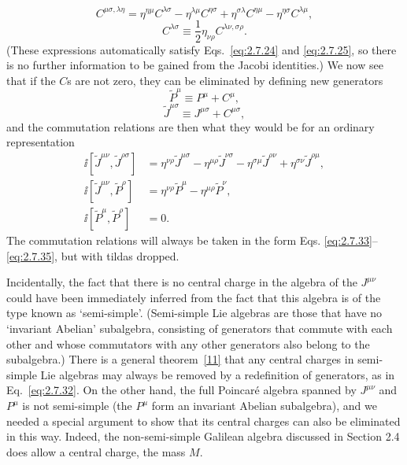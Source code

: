 \begin{equation}
  C^{\mu\sigma,\lambda\eta}
    =\eta^{\eta\mu}C^{\lambda\sigma}
      -\eta^{\lambda\mu}C^{\eta\sigma}
      +\eta^{\sigma\lambda}C^{\eta\mu}
      -\eta^{\eta\sigma}C^{\lambda\mu},
  \tag{2.7.29}\label{eq:2.7.29}
\end{equation}
\begin{equation}
  C^{\lambda\sigma}\equiv
    \frac{1}{2}\eta_{\nu\rho}C^{\lambda\nu,\sigma\rho}.
  \tag{2.7.30}\label{eq:2.7.30}
\end{equation}
(These expressions automatically satisfy Eqs.~\eqref{eq:2.7.24} and \eqref{eq:2.7.25}, so there
is no further information to be gained from the Jacobi identities.) We now see
that if the $C$s are not zero, they can be eliminated by defining new
generators
\begin{equation}
  \widetilde P^\mu\equiv P^\mu+C^\mu,
  \tag{2.7.31}\label{eq:2.7.31}
\end{equation}
\begin{equation}
  \widetilde J^{\mu\sigma}\equiv J^{\mu\sigma}+C^{\mu\sigma},
  \tag{2.7.32}\label{eq:2.7.32}
\end{equation}
and the commutation relations are then what they would be for an ordinary
representation
\begin{align}
  \ii[\widetilde J^{\mu\nu},\widetilde J^{\rho\sigma}]
  &={}
    \eta^{\nu\rho}\widetilde J^{\mu\sigma}
    -\eta^{\mu\rho}\widetilde J^{\nu\sigma}
    -\eta^{\sigma\mu}\widetilde J^{\rho\nu}
    +\eta^{\sigma\nu}\widetilde J^{\rho\mu},
  \tag{2.7.33}\label{eq:2.7.33}\\
  \ii[\widetilde J^{\mu\nu},\widetilde P^\rho]
  &={}
    \eta^{\nu\rho}\widetilde P^\mu
    -\eta^{\mu\rho}\widetilde P^\nu,
  \tag{2.7.34}\label{eq:2.7.34}\\
  \ii[\widetilde P^\mu,\widetilde P^\rho]&=0.
  \tag{2.7.35}\label{eq:2.7.35}
\end{align}
The commutation relations will always be taken in the form Eqs.
\eqref{eq:2.7.33}--\eqref{eq:2.7.35}, but with tildas dropped.

Incidentally, the fact that there is no central charge in the algebra of the
$J^{\mu\nu}$ could have been immediately inferred from the fact that this
algebra is of the type known as `semi-simple'. (Semi-simple Lie algebras are
those that have no `invariant Abelian' subalgebra, consisting of generators that
commute with each other and whose commutators with any other generators also
belong to the subalgebra.) There is a general theorem~\hyperref[ref:2.11]{[11]} that
any central charges in semi-simple Lie algebras may always be removed by a
redefinition of generators, as in Eq.~\eqref{eq:2.7.32}. On the other hand, the full
Poincar\'e algebra spanned by $J^{\mu\nu}$ and $P^\mu$ is not semi-simple (the
$P^\mu$ form an invariant Abelian subalgebra), and we needed a special argument
to show that its central charges can also be eliminated in this way. Indeed,
the non-semi-simple Galilean algebra discussed in Section 2.4 does allow a
central charge, the mass $M$.

